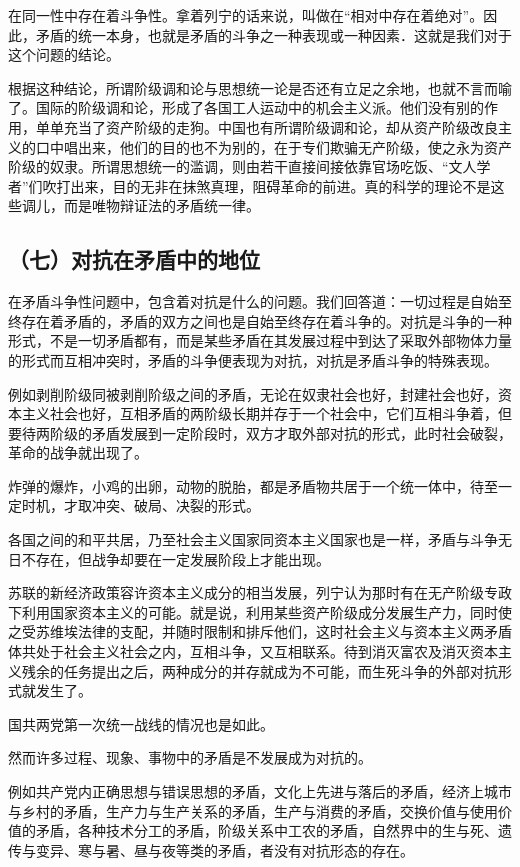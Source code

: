 在同一性中存在着斗争性。拿着列宁的话来说，叫做在“相对中存在着绝对”。因此，矛盾的统一本身，也就是矛盾的斗争之一种表现或一种因素．这就是我们对于这个问题的结论。

根据这种结论，所谓阶级调和论与思想统一论是否还有立足之余地，也就不言而喻了。国际的阶级调和论，形成了各国工人运动中的机会主义派。他们没有别的作用，单单充当了资产阶级的走狗。中国也有所谓阶级调和论，却从资产阶级改良主义的口中唱出来，他们的目的也不为别的，在于专们欺骗无产阶级，使之永为资产阶级的奴隶。所谓思想统一的滥调，则由若干直接间接依靠官场吃饭、“文人学者”们吹打出来，目的无非在抹煞真理，阻碍革命的前进。真的科学的理论不是这些调儿，而是唯物辩证法的矛盾统一律。

\subsection{（七）对抗在矛盾中的地位}

在矛盾斗争性问题中，包含着对抗是什么的问题。我们回答道：一切过程是自始至终存在着矛盾的，矛盾的双方之间也是自始至终存在着斗争的。对抗是斗争的一种形式，不是一切矛盾都有，而是某些矛盾在其发展过程中到达了采取外部物体力量的形式而互相冲突时，矛盾的斗争便表现为对抗，对抗是矛盾斗争的特殊表现。

例如剥削阶级同被剥削阶级之间的矛盾，无论在奴隶社会也好，封建社会也好，资本主义社会也好，互相矛盾的两阶级长期并存于一个社会中，它们互相斗争着，但要待两阶级的矛盾发展到一定阶段时，双方才取外部对抗的形式，此时社会破裂，革命的战争就出现了。

炸弹的爆炸，小鸡的出卵，动物的脱胎，都是矛盾物共居于一个统一体中，待至一定时机，才取冲突、破局、决裂的形式。

各国之间的和平共居，乃至社会主义国家同资本主义国家也是一样，矛盾与斗争无日不存在，但战争却要在一定发展阶段上才能出现。

苏联的新经济政策容许资本主义成分的相当发展，列宁认为那时有在无产阶级专政下利用国家资本主义的可能。就是说，利用某些资产阶级成分发展生产力，同时使之受苏维埃法律的支配，并随时限制和排斥他们，这时社会主义与资本主义两矛盾体共处于社会主义社会之内，互相斗争，又互相联系。待到消灭富农及消灭资本主义残余的任务提出之后，两种成分的并存就成为不可能，而生死斗争的外部对抗形式就发生了。

国共两党第一次统一战线的情况也是如此。

然而许多过程、现象、事物中的矛盾是不发展成为对抗的。

例如共产党内正确思想与错误思想的矛盾，文化上先进与落后的矛盾，经济上城市与乡村的矛盾，生产力与生产关系的矛盾，生产与消费的矛盾，交换价值与使用价值的矛盾，各种技术分工的矛盾，阶级关系中工农的矛盾，自然界中的生与死、遗传与变异、寒与暑、昼与夜等类的矛盾，者没有对抗形态的存在。

